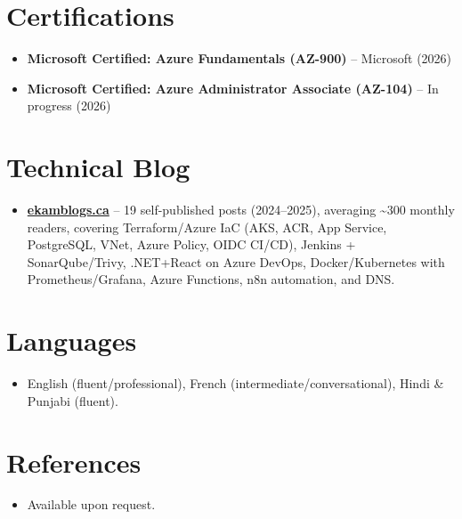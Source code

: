 \documentclass[11pt,a4paper,sans]{moderncv}
\begin{document}

\section{Certifications}
\vspace{1pt}
\begin{itemize}
\item \textbf{Microsoft Certified: Azure Fundamentals (AZ-900)} -- Microsoft (2026)
\item \textbf{Microsoft Certified: Azure Administrator Associate (AZ-104)} -- In progress (2026)
\end{itemize}


\section{Technical Blog}
\vspace{1pt}
\begin{itemize}
\item \href{https://ekamblogs.ca}{\textbf{ekamblogs.ca}} -- 19 self-published posts (2024--2025), averaging \textasciitilde300 monthly readers, covering Terraform/Azure IaC (AKS, ACR, App Service, PostgreSQL, VNet, Azure Policy, OIDC CI/CD), Jenkins + SonarQube/Trivy, .NET+React on Azure DevOps, Docker/Kubernetes with Prometheus/Grafana, Azure Functions, n8n automation, and DNS.
\end{itemize}


\section{Languages}
\vspace{1pt}
\begin{itemize}
\item English (fluent/professional), French (intermediate/conversational), Hindi \& Punjabi (fluent).
\end{itemize}


\section{References}
\vspace{1pt}
\begin{itemize}
\item{Available upon request.}
\end{itemize}
\end{document}
